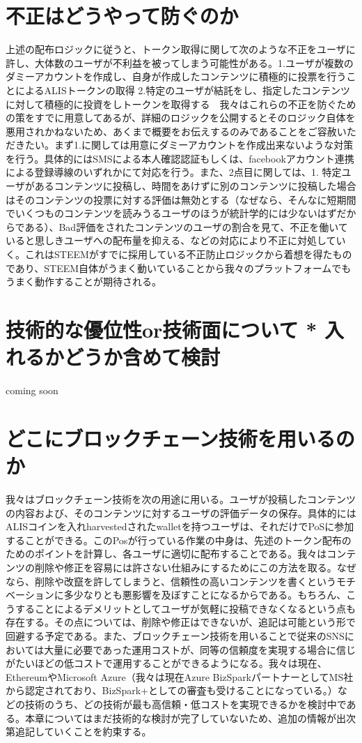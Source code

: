 \documentclass{jsarticle}
\begin{document}
\section{不正はどうやって防ぐのか}
上述の配布ロジックに従うと、トークン取得に関して次のような不正をユーザに許し、大体数のユーザが不利益を被ってしまう可能性がある。1.ユーザが複数のダミーアカウントを作成し、自身が作成したコンテンツに積極的に投票を行うことによるALISトークンの取得 2.特定のユーザが結託をし、指定したコンテンツに対して積極的に投資をしトークンを取得する　我々はこれらの不正を防ぐための策をすでに用意してあるが、詳細のロジックを公開するとそのロジック自体を悪用されかねないため、あくまで概要をお伝えするのみであることをご容赦いただきたい。まず1.に関しては用意にダミーアカウントを作成出来ないような対策を行う。具体的にはSMSによる本人確認認証もしくは、facebookアカウント連携による登録導線のいずれかにて対応を行う。また、2点目に関しては、1. 特定ユーザがあるコンテンツに投稿し、時間をあけずに別のコンテンツに投稿した場合はそのコンテンツの投票に対する評価は無効とする（なぜなら、そんなに短期間でいくつものコンテンツを読みうるユーザのほうが統計学的には少ないはずだからである）、Bad評価をされたコンテンツのユーザの割合を見て、不正を働いていると思しきユーザへの配布量を抑える、などの対応により不正に対処していく。これはSTEEMがすでに採用している不正防止ロジックから着想を得たものであり、STEEM自体がうまく動いていることから我々のプラットフォームでもうまく動作することが期待される。
\section{技術的な優位性or技術面について * 入れるかどうか含めて検討}
coming soon
\section{どこにブロックチェーン技術を用いるのか}
我々はブロックチェーン技術を次の用途に用いる。ユーザが投稿したコンテンツの内容および、そのコンテンツに対するユーザの評価データの保存。具体的にはALISコインを入れharvestedされたwalletを持つユーザは、それだけでPoSに参加することができる。このPosが行っている作業の中身は、先述のトークン配布のためのポイントを計算し、各ユーザに適切に配布することである。我々はコンテンツの削除や修正を容易には許さない仕組みにするためにこの方法を取る。なぜなら、削除や改竄を許してしまうと、信頼性の高いコンテンツを書くというモチベーションに多少なりとも悪影響を及ぼすことになるからである。もちろん、こうすることによるデメリットとしてユーザが気軽に投稿できなくなるという点も存在する。その点については、削除や修正はできないが、追記は可能という形で回避する予定である。また、ブロックチェーン技術を用いることで従来のSNSにおいては大量に必要であった運用コストが、同等の信頼度を実現する場合に信じがたいほどの低コストで運用することができるようになる。我々は現在、EthereumやMicrosoft Azure（我々は現在Azure BizSparkパートナーとしてMS社から認定されており、BizSpark+としての審査も受けることになっている。）などの技術のうち、どの技術が最も高信頼・低コストを実現できるかを検討中である。本章についてはまだ技術的な検討が完了していないため、追加の情報が出次第追記していくことを約束する。
\end{document}
